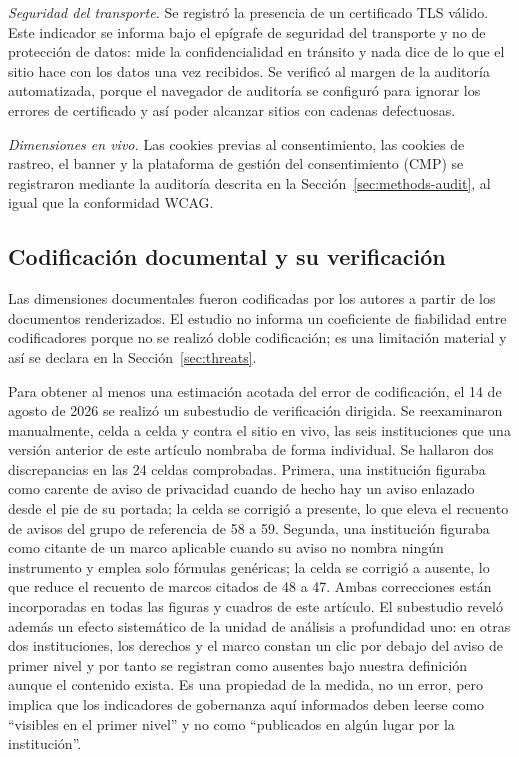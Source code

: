 \documentclass[pdflatex,sn-basic,Numbered]{sn-jnl}
\theoremstyle{thmstyleone}
\theoremstyle{thmstyletwo}
\theoremstyle{thmstylethree}
\begin{document}
\emph{Seguridad del transporte.} Se registr\'o la presencia de un certificado TLS v\'alido. Este indicador se informa bajo el ep\'igrafe de seguridad del transporte y no de protecci\'on de datos: mide la confidencialidad en tr\'ansito y nada dice de lo que el sitio hace con los datos una vez recibidos. Se verific\'o al margen de la auditor\'ia automatizada, porque el navegador de auditor\'ia se configur\'o para ignorar los errores de certificado y as\'i poder alcanzar sitios con cadenas defectuosas.

\emph{Dimensiones en vivo.} Las cookies previas al consentimiento, las cookies de rastreo, el banner y la plataforma de gesti\'on del consentimiento (CMP) se registraron mediante la auditor\'ia descrita en la Secci\'on~\ref{sec:methods-audit}, al igual que la conformidad WCAG.

\subsection{Codificaci\'on documental y su verificaci\'on}\label{sec:methods-coding}

Las dimensiones documentales fueron codificadas por los autores a partir de los documentos renderizados. El estudio no informa un coeficiente de fiabilidad entre codificadores porque no se realiz\'o doble codificaci\'on; es una limitaci\'on material y as\'i se declara en la Secci\'on~\ref{sec:threats}.

Para obtener al menos una estimaci\'on acotada del error de codificaci\'on, el 14 de agosto de 2026 se realiz\'o un subestudio de verificaci\'on dirigida. Se reexaminaron manualmente, celda a celda y contra el sitio en vivo, las seis instituciones que una versi\'on anterior de este art\'iculo nombraba de forma individual. Se hallaron dos discrepancias en las 24 celdas comprobadas. Primera, una instituci\'on figuraba como carente de aviso de privacidad cuando de hecho hay un aviso enlazado desde el pie de su portada; la celda se corrigi\'o a presente, lo que eleva el recuento de avisos del grupo de referencia de 58 a 59. Segunda, una instituci\'on figuraba como citante de un marco aplicable cuando su aviso no nombra ning\'un instrumento y emplea solo f\'ormulas gen\'ericas; la celda se corrigi\'o a ausente, lo que reduce el recuento de marcos citados de 48 a 47. Ambas correcciones est\'an incorporadas en todas las figuras y cuadros de este art\'iculo. El subestudio revel\'o adem\'as un efecto sistem\'atico de la unidad de an\'alisis a profundidad uno: en otras dos instituciones, los derechos y el marco constan un clic por debajo del aviso de primer nivel y por tanto se registran como ausentes bajo nuestra definici\'on aunque el contenido exista. Es una propiedad de la medida, no un error, pero implica que los indicadores de gobernanza aqu\'i informados deben leerse como ``visibles en el primer nivel'' y no como ``publicados en alg\'un lugar por la instituci\'on''.
\end{document}
